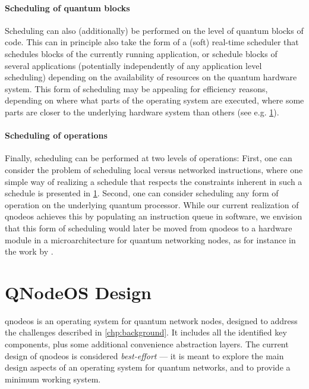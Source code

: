 \paragraph{Scheduling of quantum blocks}

Scheduling can also (additionally) be performed on the level of quantum blocks of code. This can in
principle also take the form of a (soft) real-time scheduler that schedules blocks of the currently
running application, or schedule blocks of several applications (potentially independently of any
application level scheduling) depending on the availability of resources on the quantum hardware
system. This form of scheduling may be appealing for efficiency reasons, depending on where what
parts of the operating system are executed, where some parts are closer to the underlying hardware
system than others (see e.g. \cref{sec:arch:design}).

\paragraph{Scheduling of operations}

Finally, scheduling can be performed at two levels of operations: First, one can consider the
problem of scheduling local versus networked instructions, where one simple way of realizing a
schedule that respects the constraints inherent in such a schedule is presented in
\cref{sec:arch:design}. Second, one can consider scheduling any form of operation on the underlying
quantum processor. While our current realization of \acrshort{qnodeos} achieves this by populating
an instruction queue in software, we envision that this form of scheduling would later be moved from
\acrshort{qnodeos} to a hardware module in a microarchitecture for quantum networking nodes, as for
instance in the work by \textcite{fu_2017_microarch}.

\section{QNodeOS Design}
\label{sec:arch:design}

\acrshort{qnodeos} is an operating system for quantum network nodes, designed to address the
challenges described in \cref{chp:background}. It includes all the identified key components, plus
some additional convenience abstraction layers. The current design of \acrshort{qnodeos} is
considered \emph{best-effort} --- it is meant to explore the main design aspects of an operating
system for quantum networks, and to provide a minimum working system.

